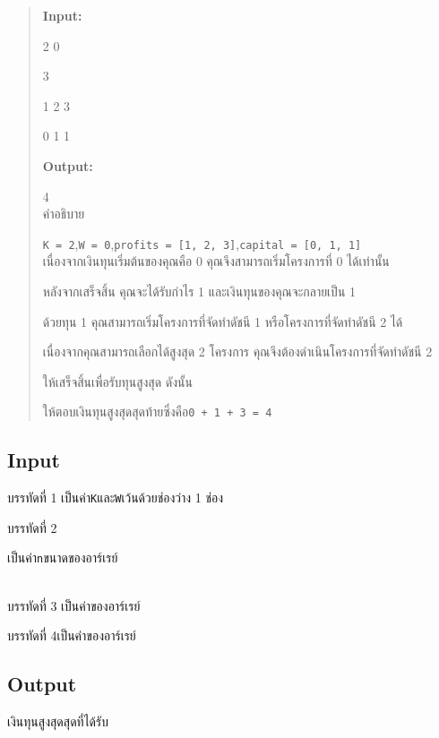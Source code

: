 \documentclass{article}
\begin{document}
\begin{quote}

\textbf{Input:}



2 0



3



1 2 3



0 1 1



\textbf{Output:}



4\\



{คำอธิบาย}



{\texttt{K\ =\ 2},\texttt{W\ =\ 0},\texttt{profits\ =\ {[}1,\ 2,\ 3{]}},\texttt{capital\ =\ {[}0,\ 1,\ 1{]}}}\\



เนื่องจากเงินทุนเริ่มต้นของคุณคือ 0 คุณจึงสามารถเริ่มโครงการที่ 0 ได้เท่านั้น



หลังจากเสร็จสิ้น คุณจะได้รับกำไร 1 และเงินทุนของคุณจะกลายเป็น 1



ด้วยทุน 1 คุณสามารถเริ่มโครงการที่จัดทำดัชนี 1 หรือโครงการที่จัดทำดัชนี 2 ได้



เนื่องจากคุณสามารถเลือกได้สูงสุด 2 โครงการ คุณจึงต้องดำเนินโครงการที่จัดทำดัชนี 2

ให้เสร็จสิ้นเพื่อรับทุนสูงสุด ดังนั้น

ให้ตอบเงินทุนสูงสุดสุดท้ายซึ่งคือ\texttt{0\ +\ 1\ +\ 3\ =\ 4}

\end{quote}



\subsection*{Input}
บรรทัดที่ 1 เป็นค่า\texttt{K}และ\texttt{W}เว้นด้วยช่องว่าง 1 ช่อง



{บรรทัดที่ 2

เป็นค่า\texttt{n}ขนาดของอาร์เรย์}\\



{{บรรทัดที่ 3 เป็นค่าของอาร์เรย์}\\

}



{{{บรรทัดที่ 4{เป็นค่าของอาร์เรย์ }{}}\\

}}



\subsection*{Output}
{เงินทุนสูงสุดสุดที่ได้รับ}\\
\end{document}
